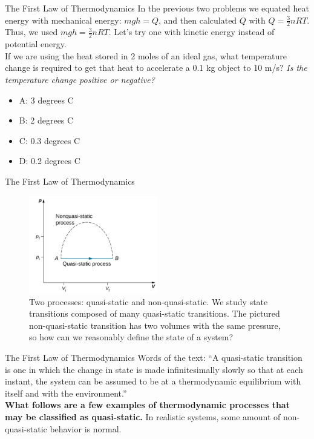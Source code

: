 \documentclass{beamer}
\begin{document}
\begin{frame}{The First Law of Thermodynamics}
In the previous two problems we equated heat energy with mechanical energy: $mgh = Q$, and then calculated $Q$ with $Q=\frac{3}{2}nRT$.  Thus, we used $mgh = \frac{3}{2}nRT$.  Let's try one with kinetic energy instead of potential energy. \\ \vspace{0.5cm}
If we are using the heat stored in 2 moles of an ideal gas, what temperature change is required to get that heat to accelerate a 0.1 kg object to 10 m/s? \textit{Is the temperature change positive or negative?}
\begin{itemize}
\item A: 3 degrees C
\item B: 2 degrees C
\item C: 0.3 degrees C
\item D: 0.2 degrees C
\end{itemize} 
\end{frame}

\begin{frame}{The First Law of Thermodynamics}
\begin{figure}
\centering
\includegraphics[width=0.5\textwidth]{figures/process.png}
\caption{\label{fig:process} Two processes: quasi-static and non-quasi-static.  We study state transitions composed of many quasi-static transitions.  The pictured non-quasi-static transition has two volumes with the same pressure, so how can we reasonably define the state of a system?}
\end{figure} 
\end{frame}

\begin{frame}{The First Law of Thermodynamics}
Words of the text: ``A quasi-static transition is one in which the change in state is made infinitesimally slowly so that at each instant, the system can be assumed to be at a thermodynamic equilibrium with itself and with the environment.'' \\ \vspace{0.5cm}
\textbf{What follows are a few examples of thermodynamic processes that may be classified as quasi-static.} In realistic systems, some amount of non-quasi-static behavior is normal.
\end{frame}
\end{document}
